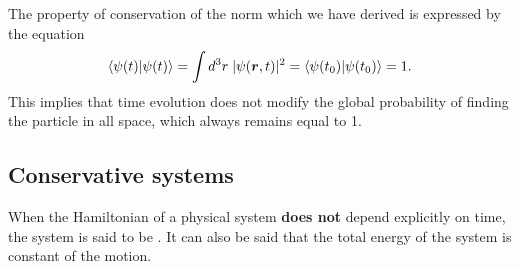 The property of conservation of the norm which we have derived is expressed by the equation
\begin{align}
    \langle\psi(t)|\psi(t)\rangle=\int d^3r\;|\psi(\bm{r},t)|^2=\langle\psi(t_0)|\psi(t_0)\rangle=1.
\end{align}
This implies that time evolution does not modify the global probability of finding the particle in all space, which always remains equal to 1.


\subsection{Conservative systems}
When the Hamiltonian of a physical system \textbf{does not} depend explicitly on time, the system is said to be .
It can also be said that the total energy of the system is constant of the motion. 
%
